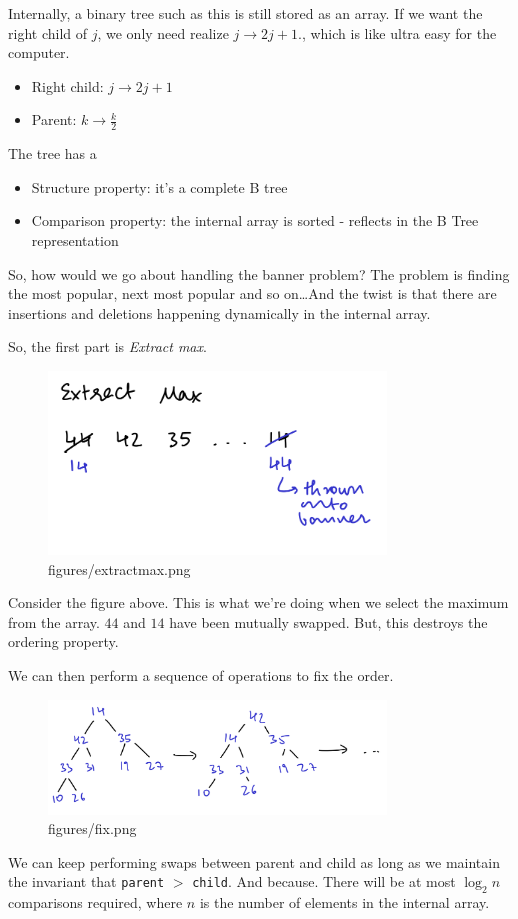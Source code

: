 \documentclass[a4paper]{article}
\begin{document}
Internally, a binary tree such as this is still stored as an array.
If we want the right child of $j$, we only need realize $j \to 2j+1$.,
which is like ultra easy for the computer.

\begin{itemize}
	\item Right child: $j\to 2j+1$ 
	\item Parent: $k\to \frac{k}{2}$
\end{itemize}
The tree has a 
\begin{itemize}
	\item Structure property: it's a complete B tree
	\item Comparison property: the internal array is sorted - reflects in the B Tree representation
\end{itemize}

So, how would we go about handling the banner problem? The problem
is finding the most popular, next most popular and so on\ldots And
the twist is that there are insertions and deletions happening
dynamically in the internal array. 

So, the first part is \textit{Extract max}.
\begin{figure}[h]
	\centering
	\includegraphics[width=0.8\textwidth]{figures/extractmax.png}
	\caption{figures/extractmax.png}
	\label{fig:Extracting the maximum}
\end{figure}
Consider the figure above. This is what we're doing when we select
the maximum from the array. $44$ and $14$ have been mutually swapped.
But, this destroys the ordering property. 

We can then perform a sequence of operations to fix the order.
\begin{figure}[h]
	\centering
	\includegraphics[width=0.8\textwidth]{figures/fix.png}
	\caption{figures/fix.png}
	\label{fig:Fixing the comparison property - propogate down}
\end{figure}
We can keep performing swaps between parent and child as long as we
maintain the invariant that  \texttt{parent} $>$ \texttt{child}.
And because. There will be at most $\log_2n$ comparisons required,
where $n$ is the number of elements in the internal array.
\end{document}
